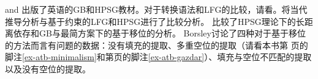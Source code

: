\citet{Borsley99a-u} and \citet{KS2008a-u}出版了英语的GB和HPSG教材。对于转换语法和LFG的比较，请看。将当代推导分析与基于约束的LFG和HPSG进行了比较分析。\citet{Borsley2012a} 比较了HPSG理论下的长距离依存和GB与最简方案下的基于移位的分析。 Borsley讨论了四种对于基于移位的方法而言有问题的数据：没有填充的提取、多重空位的提取（请看本书第\pageref{ex-atb-minimalism} 页的脚注\ref{ex-atb-minimalism}和第\pageref{ex-atb-gazdar}页的脚注\ref{ex-atb-gazdar}）、填充与空位不匹配的提取以及没有空位的提取。
















